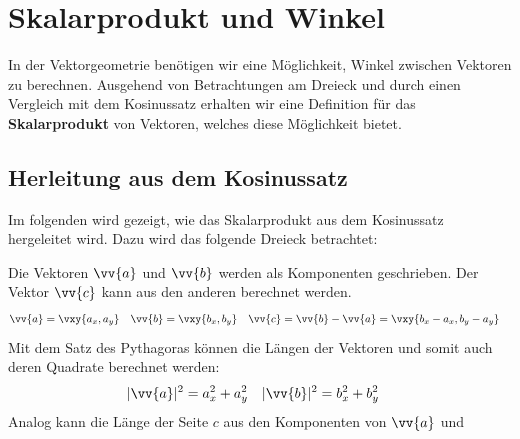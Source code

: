 \newpage
\section{Skalarprodukt und Winkel}

In der Vektorgeometrie benötigen wir eine Möglichkeit, Winkel zwischen Vektoren
zu berechnen. Ausgehend von Betrachtungen am Dreieck und durch einen Vergleich
mit dem Kosinussatz erhalten wir eine Definition für das \textbf{Skalarprodukt}
von Vektoren, welches diese Möglichkeit bietet.

\subsection{Herleitung aus dem Kosinussatz}
Im folgenden wird gezeigt, wie das Skalarprodukt aus dem Kosinussatz hergeleitet
wird. Dazu wird das folgende Dreieck betrachtet:
\begin{center}
\end{center}
Die Vektoren $\vv{a}$ und $\vv{b}$ werden als Komponenten geschrieben. Der
Vektor $\vv{c}$ kann aus den anderen berechnet werden.
\begin{align*}
  \vv{a} &= \vxy{a_{x},a_{y}} &
  \vv{b} &= \vxy{b_{x},b_{y}} &
  \vv{c} &= \vv{b}-\vv{a} = \vxy{b_{x}-a_{x},b_{y}-a_{y}}
\end{align*}
Mit dem Satz des Pythagoras können die Längen der Vektoren und somit auch
deren Quadrate berechnet werden:
\begin{align*}
  |\vv{a}|^{2} &= a_{x}^{2}+a_{y}^{2} &
  |\vv{b}|^{2} &= b_{x}^{2}+b_{y}^{2}
\end{align*}
Analog kann die Länge der Seite $c$ aus den Komponenten von $\vv{a}$ und
